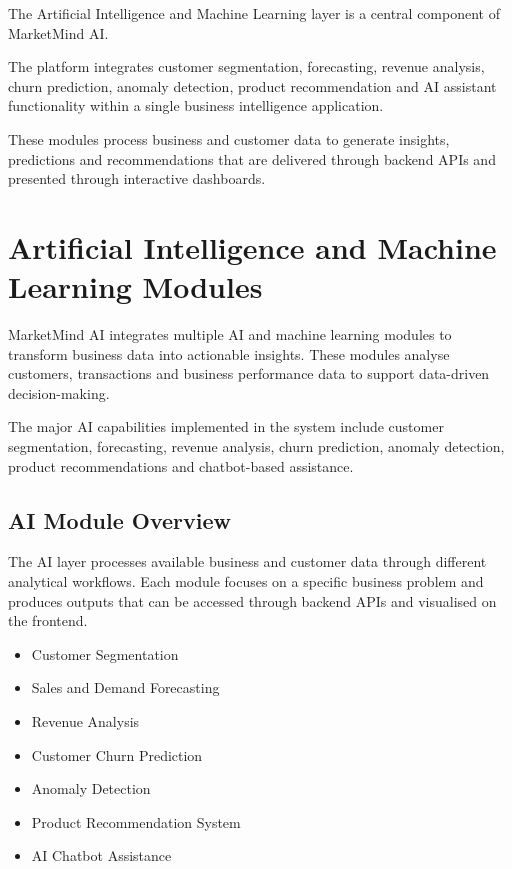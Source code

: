 \documentclass[12pt,a4paper]{report}
\begin{document}
The Artificial Intelligence and Machine Learning layer is a central
component of MarketMind AI.

The platform integrates customer segmentation, forecasting, revenue
analysis, churn prediction, anomaly detection, product recommendation
and AI assistant functionality within a single business intelligence
application.

These modules process business and customer data to generate insights,
predictions and recommendations that are delivered through backend APIs
and presented through interactive dashboards.

\newpage

\chapter{Artificial Intelligence and Machine Learning Modules}

MarketMind AI integrates multiple AI and machine learning modules to
transform business data into actionable insights. These modules analyse
customers, transactions and business performance data to support
data-driven decision-making.

The major AI capabilities implemented in the system include customer
segmentation, forecasting, revenue analysis, churn prediction, anomaly
detection, product recommendations and chatbot-based assistance.


\section{AI Module Overview}

The AI layer processes available business and customer data through
different analytical workflows. Each module focuses on a specific
business problem and produces outputs that can be accessed through
backend APIs and visualised on the frontend.

\begin{tcolorbox}[
    colback=lightblue,
    colframe=primaryblue,
    title=\textbf{AI Capabilities},
    arc=3mm
]

\begin{itemize}[leftmargin=0.7cm]
    \item Customer Segmentation
    \item Sales and Demand Forecasting
    \item Revenue Analysis
    \item Customer Churn Prediction
    \item Anomaly Detection
    \item Product Recommendation System
    \item AI Chatbot Assistance
\end{itemize}

\end{tcolorbox}
\end{document}
